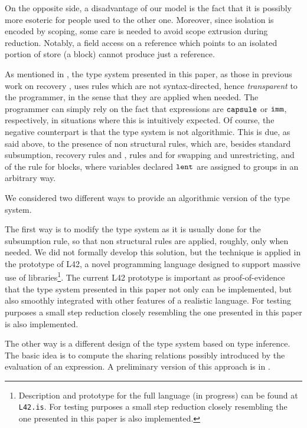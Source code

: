 {On the opposite side, a disadvantage of our model is the fact that it is possibly more esoteric for people used to the other one. Moreover, since isolation is encoded by scoping, some care is needed to avoid scope extrusion during reduction. Notably, a field access on a reference which points to an isolated portion of store (a block) cannot produce just a reference.}

{As mentioned in , the type system presented in this paper, as those in previous work on recovery \cite{GordonEtAl12,ClebschEtAl15}, uses rules which are not syntax-directed, hence \emph{transparent} to the programmer, in the sense that they are applied when needed.  The programmer can simply rely on the fact that expressions are $\texttt{capsule}$ or $\texttt{imm}$, respectively, in situations where this is intuitively expected. Of course, the negative counterpart is that the type system is not algorithmic. This is due, as said above, to the presence of non structural rules, which are, besides standard subsumption, recovery rules  and , rules  and  for swapping and unrestricting, and of the rule  for blocks, where variables declared $\texttt{lent}$ are assigned to groups in an arbitrary way.}

{We considered two different ways to provide an algorithmic version of the type system.}

{The first way is to modify the type system as it is usually done for the subsumption rule, so that non structural rules are applied, roughly, only when needed. We did not formally develop this solution, but the technique is applied in the prototype of L42, a novel programming language designed to support massive use of libraries\footnote{Description and prototype for the full language (in progress)  can be found at \texttt{L42.is}. For testing purposes a small step reduction closely resembling the one presented in this paper is also implemented.}. The current L42 prototype  is important as proof-of-evidence that the type system presented in this paper not only can be implemented, but also smoothly integrated with other features of a realistic language. 
For testing purposes a small step reduction closely resembling the one presented in this paper is also implemented.}

{The other way is a different design of the type system based on type inference. The basic idea is to compute the sharing relations possibly introduced by the evaluation of an expression. A preliminary version of this approach is in \cite{GianniniEtAl17}.}


